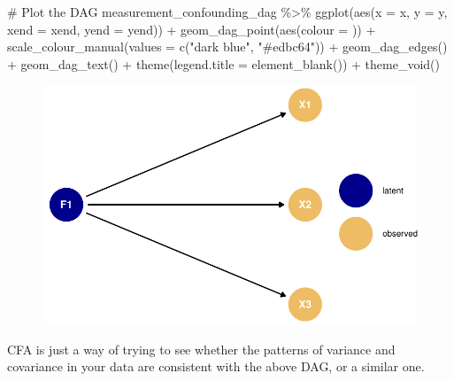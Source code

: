 \documentclass[
  letterpaper,
  DIV=11,
  numbers=noendperiod]{scrreprt}
\newenvironment{Shaded}{\begin{snugshade}}{\end{snugshade}}
\newcommand{\AttributeTok}[1]{\textcolor[rgb]{0.40,0.45,0.13}{#1}}
\newcommand{\CommentTok}[1]{\textcolor[rgb]{0.37,0.37,0.37}{#1}}
\newcommand{\FunctionTok}[1]{\textcolor[rgb]{0.28,0.35,0.67}{#1}}
\newcommand{\NormalTok}[1]{\textcolor[rgb]{0.00,0.23,0.31}{#1}}
\newcommand{\SpecialCharTok}[1]{\textcolor[rgb]{0.37,0.37,0.37}{#1}}
\newcommand{\StringTok}[1]{\textcolor[rgb]{0.13,0.47,0.30}{#1}}
\begin{document}
\begin{Shaded}
\begin{Highlighting}[]
\CommentTok{\# Plot the DAG}
\NormalTok{measurement\_confounding\_dag }\SpecialCharTok{\%\textgreater{}\%}
  \FunctionTok{ggplot}\NormalTok{(}\FunctionTok{aes}\NormalTok{(}\AttributeTok{x =}\NormalTok{ x, }\AttributeTok{y =}\NormalTok{ y, }\AttributeTok{xend =}\NormalTok{ xend, }\AttributeTok{yend =}\NormalTok{ yend)) }\SpecialCharTok{+}
  \FunctionTok{geom\_dag\_point}\NormalTok{(}\FunctionTok{aes}\NormalTok{(}\AttributeTok{colour =} \StringTok{\textasciigrave{}}\AttributeTok{ }\StringTok{\textasciigrave{}}\NormalTok{)) }\SpecialCharTok{+}
  \FunctionTok{scale\_colour\_manual}\NormalTok{(}\AttributeTok{values =} \FunctionTok{c}\NormalTok{(}\StringTok{"dark blue"}\NormalTok{, }\StringTok{"\#edbc64"}\NormalTok{)) }\SpecialCharTok{+} 
  \FunctionTok{geom\_dag\_edges}\NormalTok{() }\SpecialCharTok{+}
  \FunctionTok{geom\_dag\_text}\NormalTok{() }\SpecialCharTok{+}
  \FunctionTok{theme}\NormalTok{(}\AttributeTok{legend.title =} \FunctionTok{element\_blank}\NormalTok{()) }\SpecialCharTok{+}
  \FunctionTok{theme\_void}\NormalTok{()}
\end{Highlighting}
\end{Shaded}

\begin{figure}[H]

{\centering \includegraphics{./cfa-intro_files/figure-pdf/unnamed-chunk-2-1.pdf}

}

\end{figure}

CFA is just a way of trying to see whether the patterns of variance and
covariance in your data are consistent with the above DAG, or a similar
one.
\end{document}
